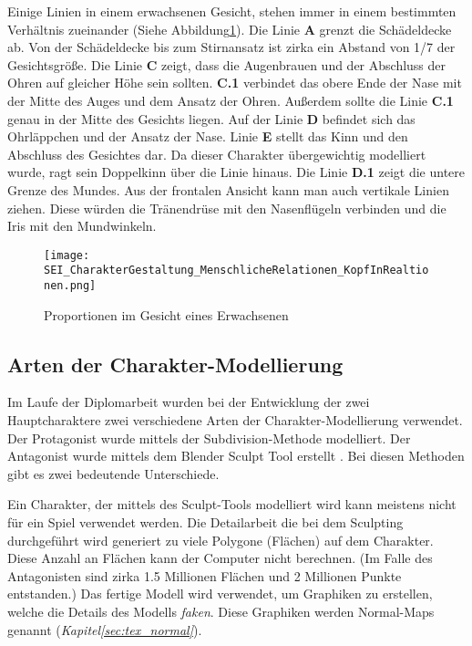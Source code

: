 Einige Linien in einem erwachsenen Gesicht, stehen immer in einem bestimmten Verhältnis zueinander
(Siehe Abbildung\ref{blender:proportions}). Die Linie \textbf{A} grenzt die Schädeldecke ab. Von
der Schädeldecke bis zum Stirnansatz ist zirka ein Abstand von 1/7 der Gesichtsgröße. Die Linie
\textbf{C} zeigt, dass die Augenbrauen und der Abschluss der Ohren auf gleicher Höhe sein sollten.
\textbf{C.1} verbindet das obere Ende der Nase mit der Mitte des Auges und dem Ansatz der Ohren.
Außerdem sollte die Linie  \textbf{C.1} genau in der Mitte des Gesichts liegen. Auf der Linie
\textbf{D} befindet sich das Ohrläppchen und der Ansatz der Nase. Linie  \textbf{E} stellt das Kinn
und den Abschluss des Gesichtes dar. Da dieser Charakter übergewichtig modelliert wurde, ragt sein
Doppelkinn über die Linie hinaus. Die Linie  \textbf{D.1} zeigt die untere Grenze des Mundes.
Aus der frontalen Ansicht kann man auch vertikale Linien ziehen. Diese würden die Tränendrüse mit den Nasenflügeln
verbinden und die Iris mit den Mundwinkeln.\citep{book:kunst_des_zeichnens}
\begin{figure}[H]
    \centering
    \texttt{[image: SEI\_CharakterGestaltung\_MenschlicheRelationen\_KopfInRealtionen.png]}
    \caption{Proportionen im Gesicht eines Erwachsenen}
    \label{blender:proportions}
\end{figure}

\subsection{Arten der Charakter-Modellierung}
Im Laufe der Diplomarbeit wurden bei der Entwicklung der zwei Hauptcharaktere zwei verschiedene Arten der
Charakter-Modellierung verwendet. Der Protagonist wurde mittels der Subdivision-Methode modelliert. Der Antagonist
wurde mittels dem Blender Sculpt Tool\citep{blender:sculpting_general} erstellt .
Bei diesen Methoden gibt es zwei bedeutende Unterschiede.


Ein Charakter, der mittels des Sculpt-Tools modelliert wird kann meistens nicht für ein Spiel verwendet werden. Die
Detailarbeit die bei dem Sculpting durchgeführt wird generiert zu viele Polygone (Flächen) auf dem Charakter. Diese
Anzahl an Flächen kann der Computer nicht berechnen. (Im Falle des Antagonisten sind zirka 1.5 Millionen Flächen und 2
Millionen Punkte entstanden.) Das fertige Modell wird verwendet, um Graphiken zu erstellen, welche die Details des
Modells \textit{faken}. Diese Graphiken werden Normal-Maps genannt (\textit{Kapitel\ref{sec:tex_normal}}).

